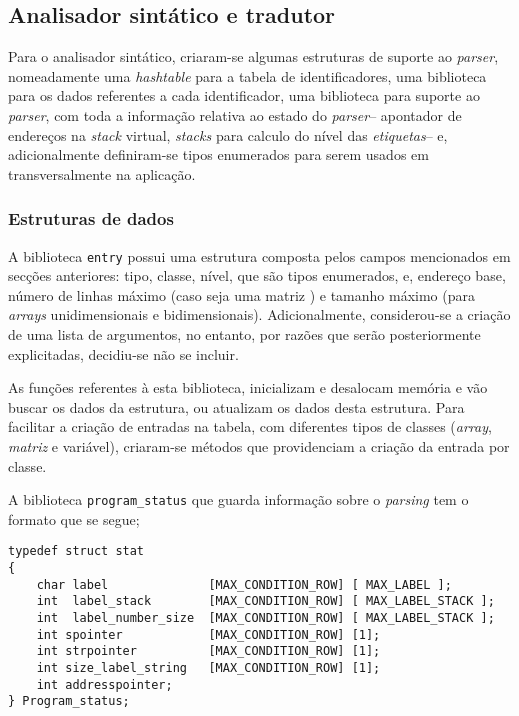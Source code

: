 \subsection{Analisador sintático e tradutor}
\label{subsec:sintatico:desenho}

Para o analisador sintático, criaram-se algumas estruturas de suporte ao
\emph{parser}, nomeadamente uma \emph{hashtable} para a tabela de
identificadores, uma biblioteca para os dados referentes a cada identificador,
uma biblioteca para suporte ao \emph{parser}, com toda a informação relativa ao
estado do \emph{parser}-- apontador de endereços na \emph{stack} virtual,
\emph{stacks} para calculo do nível das \emph{etiquetas}-- e, adicionalmente
definiram-se tipos enumerados para serem usados em transversalmente na
aplicação.





\subsubsection{Estruturas de dados}
\label{subsec:subsubsec:estruturas:desenho}

A biblioteca \texttt{entry} possui uma estrutura composta pelos campos
mencionados em secções anteriores: tipo, classe, nível, que são tipos
enumerados, e, endereço base, número de linhas máximo (caso seja uma matriz
) e tamanho máximo (para \emph{arrays} unidimensionais e bidimensionais).
Adicionalmente, considerou-se a criação de uma lista de argumentos, no entanto,
por razões que serão posteriormente explicitadas, decidiu-se não se incluir.

As funções referentes à esta biblioteca, inicializam e desalocam memória e vão
buscar os dados da estrutura, ou atualizam os dados desta estrutura. Para
facilitar a criação de entradas na tabela, com diferentes tipos de classes
(\emph{array}, \emph{matriz} e variável), criaram-se métodos que providenciam
a criação da entrada por classe.


A biblioteca \texttt{program\_status} que guarda informação sobre
o \emph{parsing} tem o formato que se segue;  

\begin{verbatim}
typedef struct stat
{
    char label              [MAX_CONDITION_ROW] [ MAX_LABEL ];
    int  label_stack        [MAX_CONDITION_ROW] [ MAX_LABEL_STACK ];
    int  label_number_size  [MAX_CONDITION_ROW] [ MAX_LABEL_STACK ];
    int spointer            [MAX_CONDITION_ROW] [1];
    int strpointer          [MAX_CONDITION_ROW] [1];
    int size_label_string   [MAX_CONDITION_ROW] [1];
    int addresspointer;
} Program_status;
\end{verbatim}

